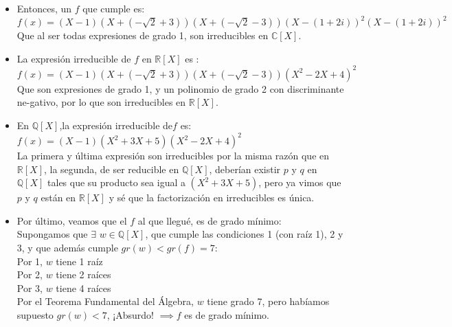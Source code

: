 \documentclass[12pt,twoside,a4paper]{exam}
\begin{document}
\begin{itemize}
      \item Entonces, un $f$ que cumple es: \\
            $f(x)=(X-1)(X+(-\sqrt{2}+3))(X+(-\sqrt{2}-3))(X-(1+2i))^2(X-(1+2i))^2$\\
            Que al ser todas expresiones de grado 1, son irreducibles en $\mathbb{C}[X]$.\\
      \item La expresión irreducible de $f$ en  $\mathbb{R}[X]$ es : \\
            $f(x)=(X-1)(X+(-\sqrt{2}+3))(X+(-\sqrt{2}-3))(X^2-2X+4)^2$\\
            Que son expresiones de grado 1, y un polinomio de grado 2
            con discriminante ne-gativo, por lo que son irreducibles en $\mathbb{R}[X]$.\\
      \item En $\mathbb{Q}[X]$,la expresión irreducible de$f$ es:\\
            $f(x)=(X-1)(X^2+3X+5)(X^2-2X+4)^2$\\
            La primera y última expresión son irreducibles por la misma razón que en 
            $\mathbb{R}[X]$, la segunda, de ser reducible en $\mathbb{Q}[X]$, deberían
            existir $p$ y $q$ en $\mathbb{Q}[X]$ tales que su producto sea igual
            a $(X^2+3X+5)$, pero ya vimos que  $p$ y $q$ están en $\mathbb{R}[X]$
            y sé que la factorización en irreducibles es única.
      \item Por último, veamos que el $f$ al que llegué, es de grado mínimo:\\
            Supongamos que $\exists$ $w \in \mathbb{Q}[X]$, que cumple las condiciones
            1 (con raíz 1), 2 y 3, y que además cumple $gr(w)<gr(f)=7$:\\
            Por 1, $w$ tiene 1 raíz \\
            Por 2, $w$ tiene 2 raíces \\
            Por 3, $w$ tiene 4 raíces \\
            Por el Teorema Fundamental del Álgebra, $w$ tiene grado 7, pero
            habíamos supuesto $gr(w) < 7 $, ¡Absurdo! $\implies f$ es de grado mínimo.

\end{itemize}
\end{document}
